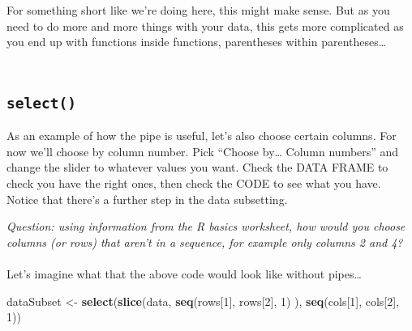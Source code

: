 \documentclass[
]{book}
\newenvironment{Shaded}{\begin{snugshade}}{\end{snugshade}}
\newcommand{\DecValTok}[1]{\textcolor[rgb]{0.00,0.00,0.81}{#1}}
\newcommand{\KeywordTok}[1]{\textcolor[rgb]{0.13,0.29,0.53}{\textbf{#1}}}
\newcommand{\NormalTok}[1]{#1}
\newcommand{\OperatorTok}[1]{\textcolor[rgb]{0.81,0.36,0.00}{\textbf{#1}}}
\newcommand{\StringTok}[1]{\textcolor[rgb]{0.31,0.60,0.02}{#1}}
\begin{document}
For something short like we're doing here, this might make sense. But as you
need to do more and more things with your data, this gets more complicated as
you end up with functions inside functions, parentheses within parentheses\ldots{}\\
~\\

\hypertarget{select}{%
\subsection{\texorpdfstring{\texttt{select()}}{select()}}\label{select}}

As an example of how the pipe is useful, let's also choose certain columns.
For now we'll choose by column number. Pick ``Choose by\ldots{} Column numbers'' and
change the slider to whatever values you want. Check the DATA FRAME to check
you have the right ones, then check the CODE to see what you have. Notice that
there's a further step in the data subsetting.

\begin{Shaded}
\end{Shaded}

\emph{Question: using information from the R basics worksheet, how would you choose
columns (or rows) that aren't in a sequence, for example only columns 2 and 4?}\\
~\\

Let's imagine what that the above code would look like without pipes\ldots{}

\begin{Shaded}
\begin{Highlighting}[]
\NormalTok{dataSubset <-}\StringTok{ }\KeywordTok{select}\NormalTok{(}\KeywordTok{slice}\NormalTok{(data, }\KeywordTok{seq}\NormalTok{(rows[}\DecValTok{1}\NormalTok{], rows[}\DecValTok{2}\NormalTok{], }\DecValTok{1}\NormalTok{) ), }\KeywordTok{seq}\NormalTok{(cols[}\DecValTok{1}\NormalTok{], cols[}\DecValTok{2}\NormalTok{], }\DecValTok{1}\NormalTok{))}
\end{Highlighting}
\end{Shaded}
\end{document}
